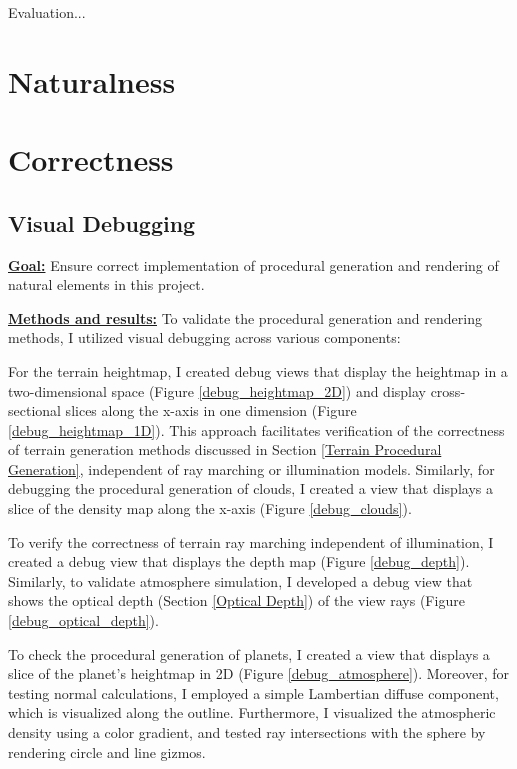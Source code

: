 \label{sec:4}

Evaluation...

\section{Naturalness}
\label{Naturalness}

\section{Correctness}
\label{Correctness}

\subsection{Visual Debugging}
\label{Visual Debugging}

\textbf{\underline{Goal:}}
Ensure correct implementation of procedural generation and rendering of natural elements in this project.

\textbf{\underline{Methods and results:}}
To validate the procedural generation and rendering methods, I utilized visual debugging across various components:

For the terrain heightmap, I created debug views that display the heightmap in a two-dimensional space (Figure \ref{debug_heightmap_2D}) and display cross-sectional slices along the x-axis in one dimension (Figure \ref{debug_heightmap_1D}). This approach facilitates verification of the correctness of terrain generation methods discussed in Section \ref{Terrain Procedural Generation}, independent of ray marching or illumination models. Similarly, for debugging the procedural generation of clouds, I created a view that displays a slice of the density map along the x-axis (Figure \ref{debug_clouds}).

To verify the correctness of terrain ray marching independent of illumination, I created a debug view that displays the depth map (Figure \ref{debug_depth}). Similarly, to validate atmosphere simulation, I developed a debug view that shows the optical depth (Section \ref{Optical Depth}) of the view rays (Figure \ref{debug_optical_depth}).

To check the procedural generation of planets, I created a view that displays a slice of the planet's heightmap in 2D (Figure \ref{debug_atmosphere}). Moreover, for testing normal calculations, I employed a simple Lambertian diffuse component, which is visualized along the outline. Furthermore, I visualized the atmospheric density using a color gradient, and tested ray intersections with the sphere by rendering circle and line gizmos.

